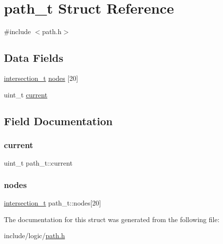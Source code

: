 \hypertarget{structpath__t}{}\section{path\+\_\+t Struct Reference}
\label{structpath__t}


{\ttfamily \#include $<$path.\+h$>$}

\subsection*{Data Fields}
\begin{DoxyCompactItemize}
\item 
\hyperlink{path_8h_a7c0743588cb6ceb494edc9898f8404bb}{intersection\+\_\+t} \hyperlink{structpath__t_ad8a5978ac106f32b7a785e8a12ee8c5d}{nodes} \mbox{[}20\mbox{]}
\item 
uint\+\_\+t \hyperlink{structpath__t_ac68ea261dcfe9d381c608fe5183efa9f}{current}
\end{DoxyCompactItemize}


\subsection{Field Documentation}
\mbox{\label{structpath__t_ac68ea261dcfe9d381c608fe5183efa9f}} 
\subsubsection{\texorpdfstring{current}{current}}
{\footnotesize\ttfamily uint\+\_\+t path\+\_\+t\+::current}

\mbox{\label{structpath__t_ad8a5978ac106f32b7a785e8a12ee8c5d}} 
\subsubsection{\texorpdfstring{nodes}{nodes}}
{\footnotesize\ttfamily \hyperlink{path_8h_a7c0743588cb6ceb494edc9898f8404bb}{intersection\+\_\+t} path\+\_\+t\+::nodes\mbox{[}20\mbox{]}}



The documentation for this struct was generated from the following file\+:\begin{DoxyCompactItemize}
\item 
include/logic/\hyperlink{path_8h}{path.\+h}\end{DoxyCompactItemize}
